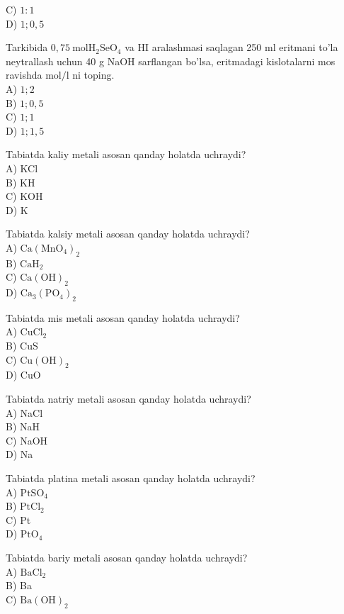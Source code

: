 C) $1: 1$\\
D) $1 ; 0,5$
  \item Tarkibida $0,75 \mathrm{~mol} \mathrm{H}_{2} \mathrm{SeO}_{4}$ va HI aralashmasi saqlagan 250 ml eritmani to'la neytrallash uchun 40 g NaOH sarflangan bo'lsa, eritmadagi kislotalarni mos ravishda $\mathrm{mol} / \mathrm{l}$ ni toping.\\
A) $1 ; 2$\\
B) $1 ; 0,5$\\
C) $1 ; 1$\\
D) $1 ; 1,5$
  \item Tabiatda kaliy metali asosan qanday holatda uchraydi?\\
A) KCl\\
B) KH\\
C) KOH\\
D) K
  \item Tabiatda kalsiy metali asosan qanday holatda uchraydi?\\
A) $\mathrm{Ca}\left(\mathrm{MnO}_{4}\right)_{2}$\\
B) $\mathrm{CaH}_{2}$\\
C) $\mathrm{Ca}(\mathrm{OH})_{2}$\\
D) $\mathrm{Ca}_{3}\left(\mathrm{PO}_{4}\right)_{2}$
  \item Tabiatda mis metali asosan qanday holatda uchraydi?\\
A) $\mathrm{CuCl}_{2}$\\
B) CuS\\
C) $\mathrm{Cu}(\mathrm{OH})_{2}$\\
D) CuO
  \item Tabiatda natriy metali asosan qanday holatda uchraydi?\\
A) NaCl\\
B) NaH\\
C) NaOH\\
D) Na
  \item Tabiatda platina metali asosan qanday holatda uchraydi?\\
A) $\mathrm{PtSO}_{4}$\\
B) $\mathrm{PtCl}_{2}$\\
C) Pt\\
D) $\mathrm{PtO}_{4}$
  \item Tabiatda bariy metali asosan qanday holatda uchraydi?\\
A) $\mathrm{BaCl}_{2}$\\
B) Ba\\
C) $\mathrm{Ba}(\mathrm{OH})_{2}$\\
